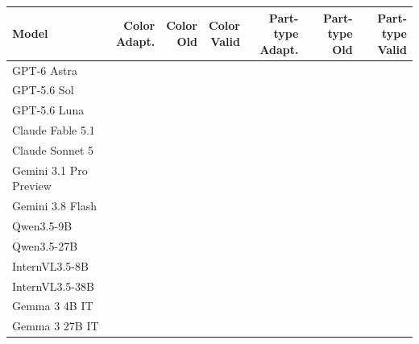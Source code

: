 \begin{tabular}{@{}lrrrrrr@{}}
\toprule
Model & \shortstack{Color\\Adapt.} & \shortstack{Color\\Old} & \shortstack{Color\\Valid} & \shortstack{Part-type\\Adapt.} & \shortstack{Part-type\\Old} & \shortstack{Part-type\\Valid}\\
\midrule
GPT-6 Astra &  &  &  &  &  & \\
GPT-5.6 Sol &  &  &  &  &  & \\
GPT-5.6 Luna &  &  &  &  &  & \\
Claude Fable 5.1 &  &  &  &  &  & \\
Claude Sonnet 5 &  &  &  &  &  & \\
Gemini 3.1 Pro Preview &  &  &  &  &  & \\
Gemini 3.8 Flash &  &  &  &  &  & \\
Qwen3.5-9B &  &  &  &  &  & \\
Qwen3.5-27B &  &  &  &  &  & \\
InternVL3.5-8B &  &  &  &  &  & \\
InternVL3.5-38B &  &  &  &  &  & \\
Gemma 3 4B IT &  &  &  &  &  & \\
Gemma 3 27B IT &  &  &  &  &  & \\
\bottomrule
\end{tabular}
